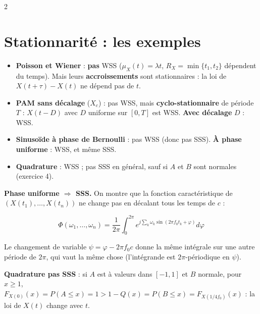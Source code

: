 \documentclass[a4paper,9pt]{extarticle}
\begin{document}
\begin{multicols}{2}
\begin{simple}
\end{simple}


\section{Stationnarité : les exemples}


\begin{example}

\begin{itemize}

\item \textbf{Poisson et Wiener} : \textbf{pas} WSS ($\mu_X(t) = \lambda t$, $R_X =
\min\{t_1,t_2\}$ dépendent du temps). Mais leurs \textbf{accroissements} sont stationnaires : la
loi de $X(t+\tau) - X(t)$ ne dépend pas de $t$.

\item \textbf{PAM sans décalage} ($X_c$) : pas WSS, mais \textbf{cyclo-stationnaire} de période
$T$ : $X(t-D)$ avec $D$ uniforme sur $[0,T]$ est WSS. \textbf{Avec décalage} $D$ : WSS.

\item \textbf{Sinusoïde à phase de Bernoulli} : pas WSS (donc pas SSS). \textbf{À phase
uniforme} : WSS, et même SSS.

\item \textbf{Quadrature} : WSS ; pas SSS en général, sauf si $A$ et $B$ sont normales
(exercice 4).

\end{itemize}

\end{example}


\begin{important}

\textbf{Phase uniforme $\Rightarrow$ SSS.} On montre que la fonction caractéristique de
$(X(t_1),\dots,X(t_n))$ ne change pas en décalant tous les temps de $c$ :

\[
\Phi(\omega_1,\dots,\omega_n) = \frac1{2\pi}\int_0^{2\pi}e^{j\sum_k\omega_k\sin(2\pi f_0t_k +
\varphi)}d\varphi
\]

Le changement de variable $\psi = \varphi - 2\pi f_0c$ donne la même intégrale sur une autre
période de $2\pi$, qui vaut la même chose (l'intégrande est $2\pi$-périodique en $\psi$).

\vspace{3pt}

\textbf{Quadrature pas SSS} : si $A$ est à valeurs dans $[-1,1]$ et $B$ normale, pour $x\ge1$,
$F_{X(0)}(x) = P(A\le x) = 1 > 1 - Q(x) = P(B\le x) = F_{X(1/4f_0)}(x)$ : la loi de $X(t)$
change avec $t$.


\end{important}
\end{multicols}
\end{document}
